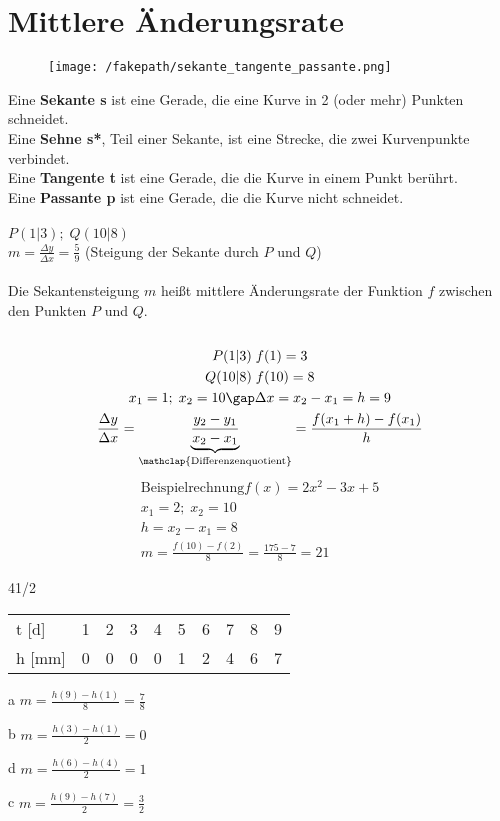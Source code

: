 \section{Mittlere Änderungsrate}
\begin{figure}[H]
  \centering
  \texttt{[image: /fakepath/sekante\_tangente\_passante.png]}
\end{figure}
Eine \textbf{Sekante s} ist eine Gerade, die eine Kurve in 2 (oder mehr) Punkten schneidet. \\
Eine \textbf{Sehne s*}, Teil einer Sekante, ist eine Strecke, die zwei Kurvenpunkte verbindet. \\
Eine \textbf{Tangente t} ist eine Gerade, die die Kurve in einem Punkt berührt. \\
Eine \textbf{Passante p} ist eine Gerade, die die Kurve nicht schneidet. \\\\
$P(1|3);\;Q(10|8)$ \\
$m = \frac{\Delta y}{\Delta x} = \frac{5}{9}$ (Steigung der Sekante durch $P$ und $Q$) \\\\
Die Sekantensteigung $m$ heißt mittlere Änderungsrate der Funktion $f$ zwischen den Punkten $P$ und $Q$. \\\\
\begin{gather*}
  P(1|3)\;f(1) = 3 \\
  Q(10|8)\;f(10) = 8 \\
  x_1 = 1;\;x_2 = 10\gap \Delta x = x_2 - x_1 = h = 9 \\
  \frac{\Delta y}{\Delta x} = \underbrace{\frac{y_2 - y_1}{x_2 - x_1}}_{\mathclap{{\text{Differenzenquotient}}}} = \frac{f(x_1 + h) - f(x_1)}{h}
\end{gather*}
\begin{gather*}
  \text{Beispielrechnung}
  f(x) = 2x^2 - 3x + 5 \\
  x_1 = 2;\; x_2 = 10 \\
  h = x_2 - x_1 = 8 \\
  m = \frac{f(10) - f(2)}{8} = \frac{175 - 7}{8} = 21
\end{gather*}
\begin{exercise}{41/2}
  \begin{tabular}{l|lllllllll}
    t {[}d{]}  & 1 & 2 & 3 & 4 & 5 & 6 & 7 & 8 & 9 \\
    h {[}mm{]} & 0 & 0 & 0 & 0 & 1 & 2 & 4 & 6 & 7
  \end{tabular}
  \item [a] $m = \frac{h(9) - h(1)}{8} = \frac{7}{8}$
  \item [b] $m = \frac{h(3) - h(1)}{2} = 0$
  \item [d] $m = \frac{h(6) - h(4)}{2} = 1$
  \item [c] $m = \frac{h(9) - h(7)}{2} = \frac{3}{2}$
\end{exercise}
